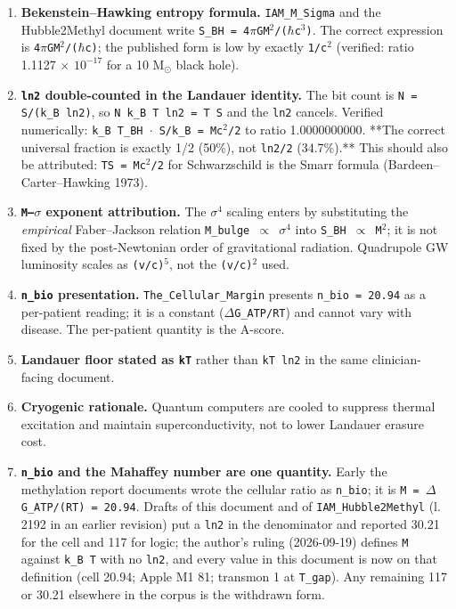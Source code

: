 \documentclass[12pt,a4paper]{article}
\begin{document}
\begin{enumerate}\setlength\itemsep{2pt}
  \item \textbf{Bekenstein--Hawking entropy formula.} \texttt{IAM\_M\_Sigma} and the Hubble2Methyl document write \texttt{S\_BH = 4$\pi$GM$^{2}$/($\hbar$c$^{3}$)}. The correct expression is \texttt{4$\pi$GM$^{2}$/($\hbar$c)}; the published form is low by exactly \texttt{1/c$^{2}$} (verified: ratio 1.1127 $\times$ $10^{-17}$ for a 10 M$_{\odot}$ black hole).
  \item \textbf{\texttt{ln2} double-counted in the Landauer identity.} The bit count is \texttt{N = S/(k\_B ln2)}, so \texttt{N k\_B T ln2 = T S} and the \texttt{ln2} cancels. Verified numerically: \texttt{k\_B T\_BH $\cdot$ S/k\_B = Mc$^{2}$/2} to ratio 1.0000000000. **The correct universal fraction is exactly 1/2 (50\%), not \texttt{ln2/2} (34.7\%).** This should also be attributed: \texttt{TS = Mc$^{2}$/2} for Schwarzschild is the Smarr formula (Bardeen--Carter--Hawking 1973).
  \item \textbf{\texttt{M--$\sigma$} exponent attribution.} The \texttt{$\sigma^{4}$} scaling enters by substituting the \textit{empirical} Faber--Jackson relation \texttt{M\_bulge $\propto$ $\sigma^{4}$} into \texttt{S\_BH $\propto$ M$^{2}$}; it is not fixed by the post-Newtonian order of gravitational radiation. Quadrupole GW luminosity scales as \texttt{(v/c)$^{5}$}, not the \texttt{(v/c)$^{2}$} used.
  \item \textbf{\texttt{n\_bio} presentation.} \texttt{The\_Cellular\_Margin} presents \texttt{n\_bio = 20.94} as a per-patient reading; it is a constant (\texttt{$\Delta$G\_ATP/RT}) and cannot vary with disease. The per-patient quantity is the A-score.
  \item \textbf{Landauer floor stated as \texttt{kT}} rather than \texttt{kT ln2} in the same clinician-facing document.
  \item \textbf{Cryogenic rationale.} Quantum computers are cooled to suppress thermal excitation and maintain superconductivity, not to lower Landauer erasure cost.
  \item \textbf{\texttt{n\_bio} and the Mahaffey number are one quantity.} Early the methylation report documents wrote the cellular ratio as \texttt{n\_bio}; it is \texttt{M = $\Delta$G\_ATP/(RT) = 20.94}. Drafts of this document and of \texttt{IAM\_Hubble2Methyl} (l.\,2192 in an earlier revision) put a \texttt{ln2} in the denominator and reported 30.21 for the cell and 117 for logic; the author's ruling (2026-09-19) defines \texttt{M} against \texttt{k\_B T} with no \texttt{ln2}, and every value in this document is now on that definition (cell 20.94; Apple M1 81; transmon 1 at \texttt{T\_gap}). Any remaining 117 or 30.21 elsewhere in the corpus is the withdrawn form.

\end{enumerate}
\end{document}
